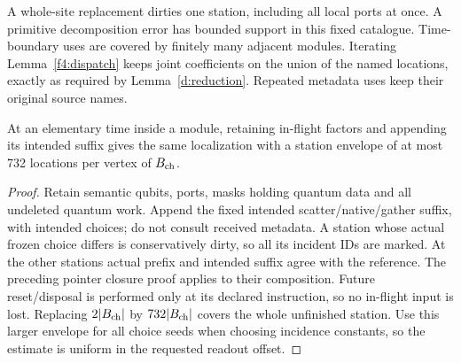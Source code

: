 A whole-site replacement dirties one station, including all local
ports at once. A primitive decomposition error has bounded support
in this fixed catalogue. Time-boundary uses are covered by finitely
many adjacent modules. Iterating Lemma~\ref{f4:dispatch} keeps joint
coefficients on the union of the named locations, exactly as required
by Lemma~\ref{d:reduction}. Repeated metadata uses keep their original
source names.

\begin{lemma}\label{f4:dispatch-partial}
At an elementary time inside a module, retaining in-flight
factors and appending its intended suffix gives the same localization
with a station envelope of at most 732 locations per vertex of \(B_{\rm ch}\).
\end{lemma}
\begin{proof}
Retain semantic qubits, ports, masks holding quantum data and all
undeleted quantum work. Append the fixed intended scatter/native/gather suffix, with intended choices; do not consult received metadata.
A station whose actual frozen choice differs is conservatively dirty,
so all its incident IDs are marked. At the other stations actual prefix
and intended suffix agree with the reference. The preceding pointer
closure proof applies to their composition. Future reset/disposal is
performed only at its declared instruction, so no in-flight input is
lost. Replacing \(2|B_{\rm ch}|\) by \(732|B_{\rm ch}|\) covers the
whole unfinished station. Use this larger envelope for all choice
seeds when choosing incidence constants, so the estimate is uniform
in the requested readout offset.
\end{proof}
